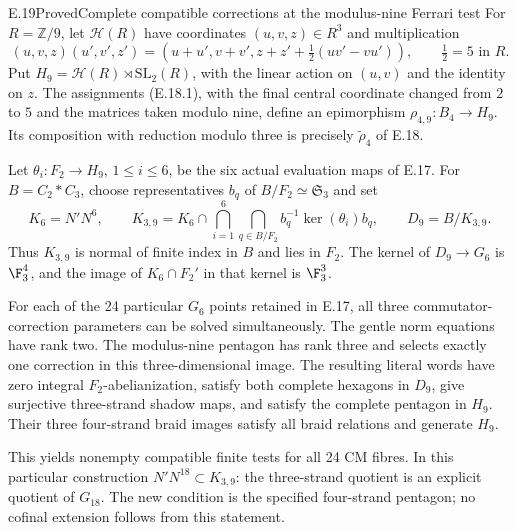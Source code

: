\begin{statement}{E.19}{Proved}{Complete compatible corrections at the modulus-nine Ferrari test}
For $R=\mathbb Z/9$, let $\mathcal H(R)$ have coordinates
$(u,v,z)\in R^3$ and multiplication
\[
 (u,v,z)(u',v',z')=
 (u+u',v+v',z+z'+\tfrac12(uv'-vu')),
 \qquad \tfrac12=5\text{ in }R.
\]
Put $H_9=\mathcal H(R)\rtimes\mathrm{SL}_2(R)$, with
the linear action on $(u,v)$ and the identity on $z$.
The assignments (E.18.1), with the final central coordinate
changed from $2$ to $5$ and the matrices taken modulo nine,
define an epimorphism $\rho_{4,9}:B_4\to H_9$.
Its composition with reduction modulo three is precisely
$\widetilde\rho_4$ of E.18.

Let $\theta_i:F_2\to H_9$, $1\leq i\leq6$, be the
six actual evaluation maps of E.17. For
$B=C_2*C_3$, choose representatives $b_q$ of
$B/F_2\simeq\mathfrak S_3$ and set
\[
 K_6=N'N^6,\qquad
 K_{3,9}=K_6\cap
   \bigcap_{i=1}^6\bigcap_{q\in B/F_2}
       b_q^{-1}\ker(\theta_i)b_q,
 \qquad D_9=B/K_{3,9}.
 \tag{E.19.1}
\]
Thus $K_{3,9}$ is normal of finite index in $B$ and lies
in $F_2$. The kernel of $D_9\to G_6$ is
$\F_3^4$, and the image of $K_6\cap F_2'$ in that
kernel is $\F_3^3$.

For each of the 24 particular $G_6$ points retained in
E.17, all three commutator-correction parameters can be
solved simultaneously. The gentle norm equations have
rank two. The modulus-nine pentagon has rank three and
selects exactly one correction in this three-dimensional
image. The resulting literal words have zero integral
$F_2$-abelianization, satisfy both complete hexagons in
$D_9$, give surjective three-strand shadow maps, and
satisfy the complete pentagon in $H_9$. Their three
four-strand braid images satisfy all braid relations
and generate $H_9$.

This yields nonempty compatible finite tests for all
24 CM fibres. In this particular construction
$N'N^{18}\subset K_{3,9}$: the three-strand quotient
is an explicit quotient of $G_{18}$. The new condition
is the specified four-strand pentagon; no cofinal
extension follows from this statement.
\end{statement}
